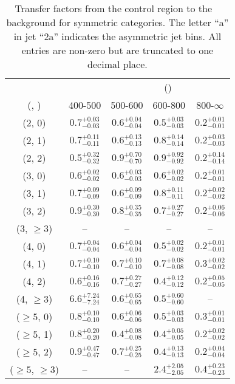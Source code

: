 \begin{table}[h!]
\tiny
\centering
\caption{Transfer factors from the \gj control region to the \zInv~ background for symmetric categories. The letter ``a'' in jet \eg ``2a''  indicates the asymmetric jet bins. All entries are non-zero but are truncated to one decimal place.\label{tab:tf_zinv_gj_sym}}
\begin{tabular}
{ccccc}
	\hline\hline
&	& \multicolumn{4}{c}{\scalht (\gev)} \\ 
	 (\njet,  \nb) & 400-500 & 500-600 & 600-800 & 800-$\infty$ \\ [0.8ex] 
\hline
	(2, 0) & $0.7^{+ 0.03 }_{- 0.03 }$ & $0.6^{+ 0.04 }_{- 0.04 }$ & $0.5^{+ 0.03 }_{- 0.03 }$ & $0.2^{+ 0.01 }_{- 0.01 }$ \\[0.5ex] 
	(2, 1) & $0.7^{+ 0.11 }_{- 0.11 }$ & $0.6^{+ 0.13 }_{- 0.13 }$ & $0.8^{+ 0.14 }_{- 0.14 }$ & $0.2^{+ 0.03 }_{- 0.03 }$ \\[0.5ex] 
	(2, 2) & $0.5^{+ 0.32 }_{- 0.32 }$ & $0.9^{+ 0.70 }_{- 0.70 }$ & $0.9^{+ 0.92 }_{- 0.92 }$ & $0.2^{+ 0.14 }_{- 0.14 }$ \\[0.5ex] 
	(3, 0) & $0.6^{+ 0.02 }_{- 0.02 }$ & $0.6^{+ 0.03 }_{- 0.03 }$ & $0.6^{+ 0.02 }_{- 0.02 }$ & $0.2^{+ 0.01 }_{- 0.01 }$ \\[0.5ex] 
	(3, 1) & $0.7^{+ 0.09 }_{- 0.09 }$ & $0.6^{+ 0.09 }_{- 0.09 }$ & $0.8^{+ 0.11 }_{- 0.11 }$ & $0.2^{+ 0.02 }_{- 0.02 }$ \\[0.5ex] 
	(3, 2) & $0.9^{+ 0.30 }_{- 0.30 }$ & $0.8^{+ 0.35 }_{- 0.35 }$ & $0.7^{+ 0.27 }_{- 0.27 }$ & $0.2^{+ 0.06 }_{- 0.06 }$ \\[0.5ex] 
	(3, $\ge3$) & -- & -- & -- & -- \\[0.5ex] 
	(4, 0) & $0.7^{+ 0.04 }_{- 0.04 }$ & $0.6^{+ 0.04 }_{- 0.04 }$ & $0.5^{+ 0.02 }_{- 0.02 }$ & $0.2^{+ 0.01 }_{- 0.01 }$ \\[0.5ex] 
	(4, 1) & $0.7^{+ 0.10 }_{- 0.10 }$ & $0.7^{+ 0.10 }_{- 0.10 }$ & $0.7^{+ 0.08 }_{- 0.08 }$ & $0.3^{+ 0.02 }_{- 0.02 }$ \\[0.5ex] 
	(4, 2) & $0.6^{+ 0.16 }_{- 0.16 }$ & $0.7^{+ 0.27 }_{- 0.27 }$ & $0.4^{+ 0.12 }_{- 0.12 }$ & $0.2^{+ 0.05 }_{- 0.05 }$ \\[0.5ex] 
	(4, $\ge3$) & $6.6^{+ 7.24 }_{- 7.24 }$ & $0.6^{+ 0.65 }_{- 0.65 }$ & $0.5^{+ 0.60 }_{- 0.60 }$ & -- \\[0.5ex] 
	($\ge5$, 0) & $0.8^{+ 0.10 }_{- 0.10 }$ & $0.6^{+ 0.06 }_{- 0.06 }$ & $0.5^{+ 0.03 }_{- 0.03 }$ & $0.3^{+ 0.01 }_{- 0.01 }$ \\[0.5ex] 
	($\ge5$, 1) & $0.8^{+ 0.20 }_{- 0.20 }$ & $0.4^{+ 0.08 }_{- 0.08 }$ & $0.4^{+ 0.05 }_{- 0.05 }$ & $0.2^{+ 0.02 }_{- 0.02 }$ \\[0.5ex] 
	($\ge5$, 2) & $0.9^{+ 0.47 }_{- 0.47 }$ & $0.7^{+ 0.25 }_{- 0.25 }$ & $0.4^{+ 0.13 }_{- 0.13 }$ & $0.2^{+ 0.04 }_{- 0.04 }$ \\[0.5ex] 
	($\ge5$, $\ge3$) & -- & -- & $2.4^{+ 2.05 }_{- 2.05 }$ & $0.4^{+ 0.23 }_{- 0.23 }$ \\[0.5ex] 
	\hline
	\hline
\end{tabular}
\end{table}
